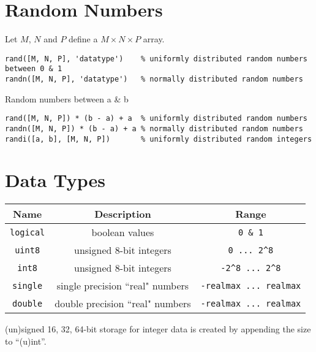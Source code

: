 \documentclass{article}
\begin{document}
\lstset{language=Matlab, upquote=true}

\lstset{
    basicstyle = \ttfamily, columns = fullflexible, keepspaces = true
}

\section*{Random Numbers}
Let $M$, $N$ and $P$ define a $M\times N\times P$ array.
\begin{lstlisting}
rand([M, N, P], 'datatype')    % uniformly distributed random numbers between 0 & 1
randn([M, N, P], 'datatype')   % normally distributed random numbers
\end{lstlisting}
Random numbers between a \& b
\begin{lstlisting}
rand([M, N, P]) * (b - a) + a  % uniformly distributed random numbers
randn([M, N, P]) * (b - a) + a % normally distributed random numbers
randi([a, b], [M, N, P])       % uniformly distributed random integers
\end{lstlisting}
\section*{Data Types}
\begin{table}[H]
    \centering
    \begin{tabular}{c | c | c}
        \toprule
        \textbf{Name} & \textbf{Description} & \textbf{Range} \\
        \midrule
        \lstinline!logical! & boolean values                   & \lstinline!0 & 1! \\
        \lstinline!uint8!   & unsigned 8-bit integers          & \lstinline!0 ... 2^8! \\
        \lstinline!int8!    & unsigned 8-bit integers          & \lstinline!-2^8 ... 2^8! \\
        \lstinline!single!  & single precision ``real" numbers & \lstinline!-realmax ... realmax! \\
        \lstinline!double!  & double precision ``real" numbers & \lstinline!-realmax ... realmax! \\
        \bottomrule
    \end{tabular}
\end{table}
(un)signed 16, 32, 64-bit storage for integer data is created by appending the size to ``(u)int''.
\end{document}
